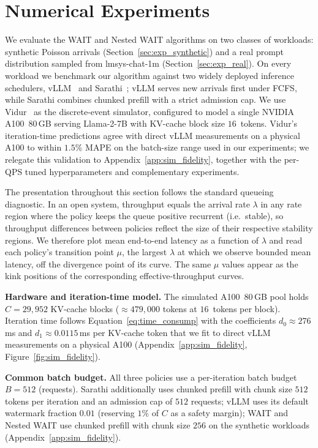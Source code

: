 \section{Numerical Experiments}
\label{sec:experiments}

We evaluate the WAIT and Nested WAIT algorithms on two classes of workloads: synthetic Poisson arrivals (Section~\ref{sec:exp_synthetic}) and a real prompt distribution sampled from lmsys-chat-1m (Section~\ref{sec:exp_real}). On every workload we benchmark our algorithm against two widely deployed inference schedulers, vLLM~\citep{kwon2023efficient} and Sarathi~\citep{agrawal2023sarathi}; vLLM serves new arrivals first under FCFS, while Sarathi combines chunked prefill with a strict admission cap. We use Vidur~\citep{agrawal2024vidur} as the discrete-event simulator, configured to model a single NVIDIA A100~80\,GB serving Llama-2-7B with KV-cache block size $16$~tokens. Vidur's iteration-time predictions agree with direct vLLM measurements on a physical A100 to within $1.5\%$ MAPE on the batch-size range used in our experiments; we relegate this validation to Appendix~\ref{app:sim_fidelity}, together with the per-QPS tuned hyperparameters and complementary experiments.

The presentation throughout this section follows the standard queueing diagnostic. In an open system, throughput equals the arrival rate $\lambda$ in any rate region where the policy keeps the queue positive recurrent (i.e.\ stable), so throughput differences between policies reflect the size of their respective stability regions. We therefore plot mean end-to-end latency as a function of $\lambda$ and read each policy's transition point $\mu$, the largest $\lambda$ at which we observe bounded mean latency, off the divergence point of its curve. The same $\mu$ values appear as the kink positions of the corresponding effective-throughput curves.

\textbf{Hardware and iteration-time model.} The simulated A100~80\,GB pool holds $C = 29{,}952$ KV-cache blocks ($\approx 479{,}000$ tokens at $16$~tokens per block). Iteration time follows Equation~\eqref{eq:time_consump} with the coefficients $d_0 \approx 276$\,ms and $d_1 \approx 0.0115$\,ms per KV-cache token that we fit to direct vLLM measurements on a physical A100 (Appendix~\ref{app:sim_fidelity}, Figure~\ref{fig:sim_fidelity}).

\textbf{Common batch budget.} All three policies use a per-iteration batch budget $B = 512$ (requests). Sarathi additionally uses chunked prefill with chunk size $512$ tokens per iteration and an admission cap of $512$ requests; vLLM uses its default watermark fraction $0.01$ (reserving $1\%$ of $C$ as a safety margin); WAIT and Nested WAIT use chunked prefill with chunk size $256$ on the synthetic workloads (Appendix~\ref{app:sim_fidelity}).

